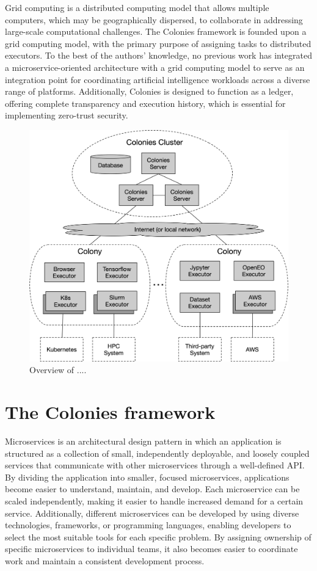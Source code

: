\documentclass{article}
\begin{document}
Grid computing \cite{grid_computing} is a distributed computing model that allows multiple computers, which may be geographically dispersed, to collaborate in addressing large-scale computational challenges. The Colonies framework is founded upon a grid computing model, with the primary purpose of assigning tasks to distributed executors. To the best of the authors' knowledge, no previous work has integrated a microservice-oriented architecture with a grid computing model to serve as an integration point for coordinating artificial intelligence workloads across a diverse range of platforms. Additionally, Colonies is designed to function as a ledger, offering complete transparency and execution history, which is essential for implementing zero-trust security.

\begin{figure}[h]
	\centering
    \includegraphics[scale=0.35]{overview.png}
	\caption{Overview of ....}
	\label{fig:function_spec}
\end{figure}

\section{The Colonies framework}
\label{sec:headings}
Microservices is an architectural design pattern in which an application is structured as a collection of small, independently deployable, and loosely coupled services that communicate with other microservices through a well-defined API. By dividing the application into smaller, focused microservices, applications become easier to understand, maintain, and develop. Each microservice can be scaled independently, making it easier to handle increased demand for a certain service. Additionally, different microservices can be developed by using diverse technologies, frameworks, or programming languages, enabling developers to select the most suitable tools for each specific problem. By assigning ownership of specific microservices to individual teams, it also becomes easier to coordinate work and maintain a consistent development process.
\end{document}
